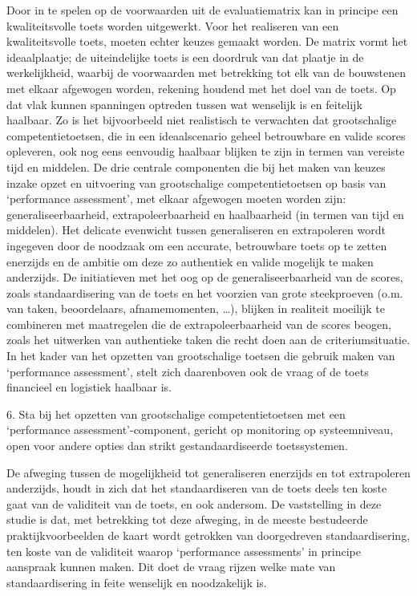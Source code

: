\documentclass[
  letterpaper,
]{report}
\begin{document}
Door in te spelen op de voorwaarden uit de evaluatiematrix kan in
principe een kwaliteitsvolle toets worden uitgewerkt. Voor het
realiseren van een kwaliteitsvolle toets, moeten echter keuzes gemaakt
worden. De matrix vormt het ideaalplaatje; de uiteindelijke toets is een
doordruk van dat plaatje in de werkelijkheid, waarbij de voorwaarden met
betrekking tot elk van de bouwstenen met elkaar afgewogen worden,
rekening houdend met het doel van de toets. Op dat vlak kunnen
spanningen optreden tussen wat wenselijk is en feitelijk haalbaar. Zo is
het bijvoorbeeld niet realistisch te verwachten dat grootschalige
competentietoetsen, die in een ideaalscenario geheel betrouwbare en
valide scores opleveren, ook nog eens eenvoudig haalbaar blijken te zijn
in termen van vereiste tijd en middelen. De drie centrale componenten
die bij het maken van keuzes inzake opzet en uitvoering van
grootschalige competentietoetsen op basis van `performance assessment',
met elkaar afgewogen moeten worden zijn: generaliseerbaarheid,
extrapoleerbaarheid en haalbaarheid (in termen van tijd en middelen).
Het delicate evenwicht tussen generaliseren en extrapoleren wordt
ingegeven door de noodzaak om een accurate, betrouwbare toets op te
zetten enerzijds en de ambitie om deze zo authentiek en valide mogelijk
te maken anderzijds. De initiatieven met het oog op de
generaliseerbaarheid van de scores, zoals standaardisering van de toets
en het voorzien van grote steekproeven (o.m. van taken, beoordelaars,
afnamemomenten, \ldots), blijken in realiteit moeilijk te combineren met
maatregelen die de extrapoleerbaarheid van de scores beogen, zoals het
uitwerken van authentieke taken die recht doen aan de criteriumsituatie.
In het kader van het opzetten van grootschalige toetsen die gebruik
maken van `performance assessment', stelt zich daarenboven ook de vraag
of de toets financieel en logistiek haalbaar is.

{ 6. Sta bij het opzetten van grootschalige competentietoetsen met een
`performance assessment'-component, gericht op monitoring op
systeemniveau, open voor andere opties dan strikt gestandaardiseerde
toetssystemen. }

De afweging tussen de mogelijkheid tot generaliseren enerzijds en tot
extrapoleren anderzijds, houdt in zich dat het standaardiseren van de
toets deels ten koste gaat van de validiteit van de toets, en ook
andersom. De vaststelling in deze studie is dat, met betrekking tot deze
afweging, in de meeste bestudeerde praktijkvoorbeelden de kaart wordt
getrokken van doorgedreven standaardisering, ten koste van de validiteit
waarop `performance assessments' in principe aanspraak kunnen maken. Dit
doet de vraag rijzen welke mate van standaardisering in feite wenselijk
en noodzakelijk is.
\end{document}
